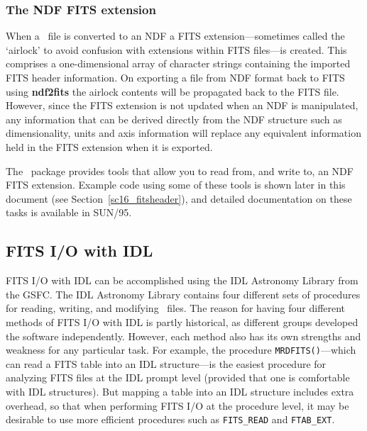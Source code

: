 \documentclass[twoside,11pt]{article}
\newcommand{\htmladdnormallink}[2]{#1}
\newcommand{\htmlref}[2]{#1}
\newcommand{\xref}[3]{#1}
\newcommand{\xlabel}[1]{}
\newcommand{\latex}[1]{#1}
\begin{document}
\subsubsection{The NDF FITS extension}

When a \FITSref\ file is converted to an \xref{NDF}{sun33}{} a FITS
extension---sometimes called the `airlock' to avoid confusion with
extensions within FITS files---is created.  This comprises a
one-dimensional array of character strings containing the imported
FITS header information.  On exporting a file from NDF format back to
FITS using \xref{{\bf ndf2fits}}{sun55}{NDF2FITS} the airlock contents
will be propagated back to the FITS file.  However, since the FITS
extension is not updated when an NDF is manipulated, any information
that can be derived directly from the NDF structure such as
dimensionality, units and axis information will replace any equivalent
information held in the FITS extension when it is exported.

The \KAPPAref\ package provides tools that allow you to read from, and
write to, an NDF FITS extension.  Example code using some of these
tools is shown later in this
\htmlref{document}{sc16_fitsheader}\latex{ (see
Section~\ref{sc16_fitsheader})}, and detailed documentation on these
tasks is available in \xref{SUN/95}{sun95}{se_fitsairlock}.

\subsection{\xlabel{sc16_fitsidl}FITS I/O with IDL\label{sc16_fitsidl}}

\htmladdnormallink{FITS
I/O}{http://idlastro.gsfc.nasa.gov/fitsio.html} with IDL can be
accomplished using the \htmladdnormallink{IDL Astronomy
Library}{http://idlastro.gsfc.nasa.gov/homepage.html} from the GSFC.
The IDL Astronomy Library contains four different sets of procedures
for reading, writing, and modifying \FITSref\ files.  The reason for having
four different methods of FITS I/O with IDL is partly historical, as
different groups developed the software independently.  However, each
method also has its own strengths and weakness for any particular
task.  For example, the procedure {\tt MRDFITS()}---which can read a
FITS table into an IDL structure---is the easiest procedure for
analyzing FITS files at the IDL prompt level (provided that one is
comfortable with IDL structures).  But mapping a table into an IDL
structure includes extra overhead, so that when performing FITS I/O at
the procedure level, it may be desirable to use more efficient
procedures such as {\tt FITS\_READ} and {\tt FTAB\_EXT}.
\end{document}
